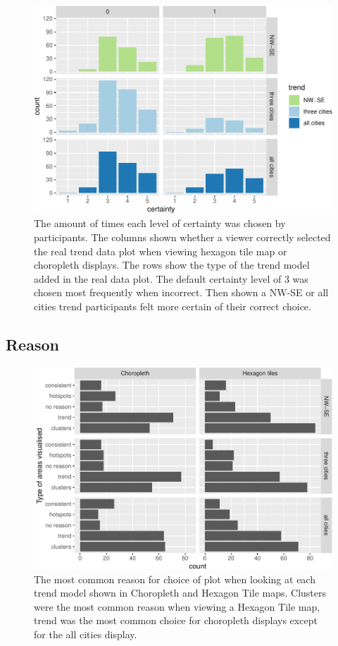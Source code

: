 \documentclass[conference,final,]{IEEEtran}
\makeatletter
\def\maxwidth{\ifdim\Gin@nat@width>\linewidth\linewidth
\else\Gin@nat@width\fi}
\let\Oldincludegraphics\includegraphics
\renewcommand{\includegraphics}[1]{\Oldincludegraphics[width=\maxwidth]{#1}}
\makeatother
\begin{document}
\begin{figure}
\centering
\includegraphics{paper_files/figure-latex/unnamed-chunk-3-1.pdf}
\caption{The amount of times each level of certainty was chosen by
participants. The columns shown whether a viewer correctly selected the
real trend data plot when viewing hexagon tile map or choropleth
displays. The rows show the type of the trend model added in the real
data plot. The default certainty level of 3 was chosen most frequently
when incorrect. Then shown a NW-SE or all cities trend participants felt
more certain of their correct choice.}
\end{figure}

\hypertarget{reason}{%
\subsection{Reason}\label{reason}}

\begin{figure}
\centering
\includegraphics{paper_files/figure-latex/unnamed-chunk-4-1.pdf}
\caption{The most common reason for choice of plot when looking at each
trend model shown in Choropleth and Hexagon Tile maps. Clusters were the
most common reason when viewing a Hexagon Tile map, trend was the most
common choice for choropleth displays except for the all cities
display.}
\end{figure}
\end{document}
